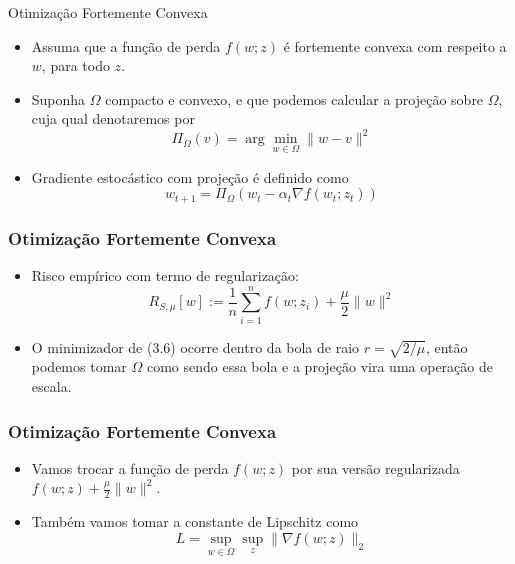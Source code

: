 \documentclass{beamer}
\begin{document}
\begin{frame}{Otimização Fortemente Convexa}
    \begin{itemize}
        \item Assuma que a função de perda \(f(w;z)\) é fortemente convexa com respeito a \(w\), para todo \(z\).
        \item Suponha $\Omega$ compacto e convexo, e que podemos calcular a projeção sobre $\Omega$, cuja qual denotaremos por 
        \begin{equation*}
            \Pi_{\Omega}(v) = \arg\min_{w\in\Omega}\|w-v\|^2
        \end{equation*}
        \item Gradiente estocástico com projeção é definido como
        \begin{equation*} \tag{3.5}
            w_{t+1} = \Pi_{\Omega}(w_t - \alpha_t \nabla f(w_t;z_t))
        \end{equation*}
    \end{itemize}
\end{frame}

\begin{frame}
    \frametitle{Otimização Fortemente Convexa}
    \begin{itemize}
        \item Risco empírico com termo de regularização:
        \begin{equation*}\tag{3.6}
            R_{S,\mu}[w] := \frac{1}{n}\sum_{i=1}^{n}f(w;z_i) + \frac{\mu}{2}\|w\|^2
        \end{equation*}
        \item O minimizador de (3.6) ocorre dentro da bola de raio $r=\sqrt{2/\mu}$, então podemos tomar $\Omega$ como sendo essa bola e a projeção vira uma operação de escala. 
    \end{itemize}
\end{frame}

\begin{frame}
    \frametitle{Otimização Fortemente Convexa}
    \begin{itemize}
        \item Vamos trocar a função de perda \(f(w;z)\) por sua versão regularizada \(f(w;z) + \frac{\mu}{2}\|w\|^2\).
        \item Também vamos tomar a constante de Lipschitz como
        \begin{equation*}\tag{3.7}
            L = \sup_{w\in\Omega}\sup_{z}\|\nabla f(w;z)\|_2
        \end{equation*}
    \end{itemize}
\end{frame}
\end{document}
